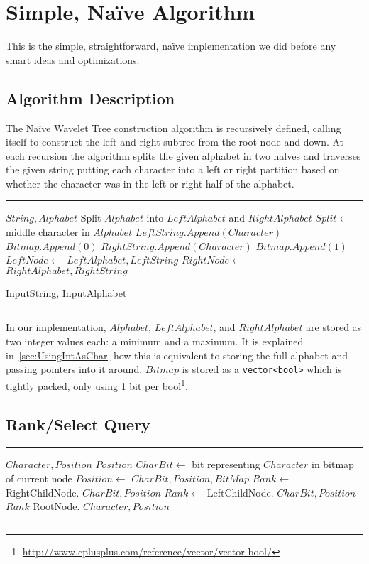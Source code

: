 \section{Simple, Naïve Algorithm}
This is the simple, straightforward, naïve implementation we did before any smart ideas and optimizations.
\subsection{Algorithm Description}
The Naïve Wavelet Tree construction algorithm is recursively defined, calling itself to construct the left and right subtree from the root node and down. At each recursion the algorithm splits the given alphabet in two halves and traverses the given string putting each character into a left or right partition based on whether the character was in the left or right half of the alphabet.

\noindent\rule{\textwidth}{0.5pt}
\begin{algorithmic}
 {$String, Alphabet$}
	\State \Return
\EndIf
\State Split $Alphabet$ into $LeftAlphabet$ and $RightAlphabet$
\State $Split \gets$ middle character in $Alphabet$
		\State $LeftString.Append(Character)$
		\State $Bitmap.Append(0)$
	\Else
		\State $RightString.Append(Character)$
		\State $Bitmap.Append(1)$
	\EndIf
\EndFor
\State $LeftNode \gets$  {$LeftAlphabet, LeftString$}
\State $RightNode \gets$  {$RightAlphabet, RightString$}
\EndFunction

\State {} {InputString, InputAlphabet}
\end{algorithmic}
\noindent\rule{\textwidth}{0.5pt}
\linebreak

\noindent In our implementation, $Alphabet$, $LeftAlphabet$, and $RightAlphabet$ are stored as two integer values each: a minimum and a maximum. It is explained in~\ref{sec:UsingIntAsChar} how this is equivalent to storing the full alphabet and passing pointers into it around. $Bitmap$ is stored as a \texttt{vector<bool>} which is tightly packed, only using 1 bit per bool\footnote{\url{http://www.cplusplus.com/reference/vector/vector-bool/}}.

\subsection{Rank/Select Query}
\noindent\rule{\textwidth}{0.5pt}
\begin{algorithmic} 
 {$Character, Position$}
\State \Return $Position$
\EndIf
\State $CharBit \gets$ bit representing $Character$ in bitmap of current node
\State $Position \gets$  {$CharBit, Position, BitMap$}
	\State $Rank \gets$ RightChildNode. {$CharBit, Position$}
\Else
	\State $Rank \gets$ LeftChildNode. {$CharBit, Position$}
\EndIf
\State \Return $Rank$ 
\EndFunction
\State RootNode. {$Character, Position$}
\end{algorithmic}
\noindent\rule{\textwidth}{0.5pt}
\linebreak

